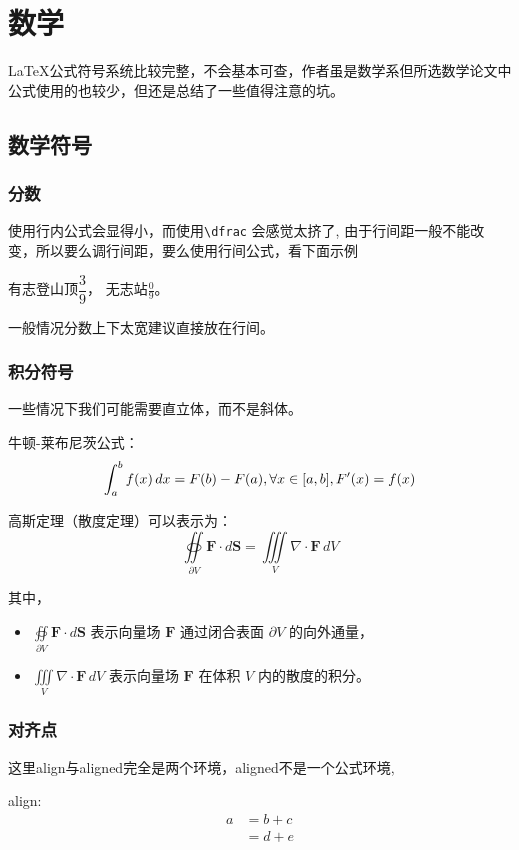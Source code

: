 \section{数学}
\LaTeX 公式符号系统比较完整，不会基本可查，作者虽是数学系但所选数学论文中公式使用的也较少，但还是总结了一些值得注意的坑。
\subsection{数学符号}
\subsubsection{分数}
使用行内公式会显得小，而使用\verb|\dfrac| 会感觉太挤了, 由于行间距一般不能改变，所以要么调行间距，要么使用行间公式，看下面示例
\begin{center}
    \begin{minipage}[c]{4em}
    有志登山顶$\dfrac{3}{9}$， 无志站$\frac{0}{9}$。
\end{minipage}
\end{center}
一般情况分数上下太宽建议直接放在行间。
\subsubsection{积分符号}
一些情况下我们可能需要直立体，而不是斜体。

 牛顿-莱布尼茨公式：
\[ \int_a^b f(x)\, dx=F(b)-F(a) , \forall x \in [a,b],F^{\prime}(x)=f(x) \]


高斯定理（散度定理）可以表示为：
\[
\oiint\limits_{\partial V} \mathbf{F} \cdot d\mathbf{S} = \iiint\limits_{V} \nabla \cdot \mathbf{F} \, dV
\]

其中，
\begin{itemize}
    \item $\oiint\limits_{\partial V} \mathbf{F} \cdot d\mathbf{S}$ 表示向量场 $\mathbf{F}$ 通过闭合表面 $\partial V$ 的向外通量，
    \item $\iiint\limits_{V} \nabla \cdot \mathbf{F} \, dV$ 表示向量场 $\mathbf{F}$ 在体积 $V$ 内的散度的积分。
\end{itemize}


\subsubsection{对齐点}
这里align与aligned完全是两个环境，aligned不是一个公式环境,

align:
\begin{align}
 a & = b + c \\
 & = d + e 
 \end{align}
 
